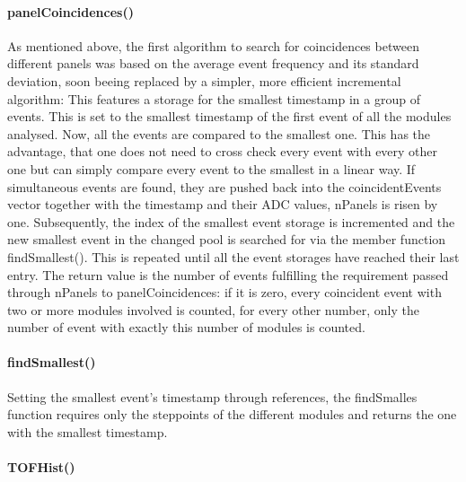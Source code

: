     \paragraph{panelCoincidences()}
    \label{ch:Analysis software:sec:methods of the class run:subsec:panelCoincidences()}

    As mentioned above, the first algorithm to search for coincidences between different panels was based on the average event frequency and its standard deviation, soon beeing replaced by a simpler, more efficient incremental algorithm:
    This features a storage for the smallest timestamp in a group of events.  This is set to the smallest timestamp of the first event of all the modules analysed. Now, all the events are compared to the smallest one. This has the advantage, that one does not need to cross check every event with every other one but can simply compare every event to the smallest in a linear way. If simultaneous events are found, they are pushed back into the coincidentEvents vector together with the timestamp and their ADC values, nPanels is risen by one. Subsequently, the index of the smallest event storage is incremented and the new smallest event in the changed pool is searched for via the member function findSmallest(). This is repeated until all the event storages have reached their last entry.
    The return value is the number of events fulfilling the requirement passed through nPanels to panelCoincidences: if it is zero, every coincident event with two or more modules involved is counted, for every other number, only the number of event with exactly this number of modules is counted.

    \paragraph{findSmallest()}
    \label{ch:Analysis software:sec:methods of the class run:subsec:findSmallest()}
    
    Setting the smallest event's timestamp through references, the findSmalles function requires only the steppoints of the different modules and returns the one with the smallest timestamp. 
    
    \paragraph{TOFHist()}
    \label{ch:Analysis software:sec:methods of the class run:subsec:TOFHist()}
    
